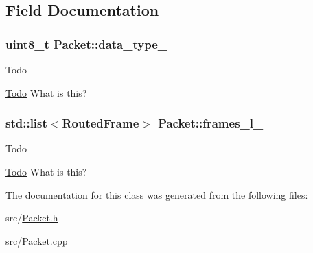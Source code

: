 \subsection{Field Documentation}
\hypertarget{classPacket_a6eee220fed8f687022dde8c2a162080e}{
\subsubsection[{data\-\_\-type\-\_\-}]{\setlength{\rightskip}{0pt plus 5cm}uint8\-\_\-t Packet\-::data\-\_\-type\-\_\-}}\label{classPacket_a6eee220fed8f687022dde8c2a162080e}
\begin{DoxyRefDesc}{Todo}
\item[\hyperlink{todo__todo000003}{Todo}]What is this? \end{DoxyRefDesc}
\hypertarget{classPacket_af17876338c2f107655106432b5a6c2fd}{
\subsubsection[{frames\-\_\-l\-\_\-}]{\setlength{\rightskip}{0pt plus 5cm}std\-::list$<${\bf Routed\-Frame}$>$ Packet\-::frames\-\_\-l\-\_\-}}\label{classPacket_af17876338c2f107655106432b5a6c2fd}
\begin{DoxyRefDesc}{Todo}
\item[\hyperlink{todo__todo000004}{Todo}]What is this? \end{DoxyRefDesc}


The documentation for this class was generated from the following files\-:\begin{DoxyCompactItemize}
\item 
src/\hyperlink{Packet_8h}{Packet.\-h}\item 
src/Packet.\-cpp\end{DoxyCompactItemize}
